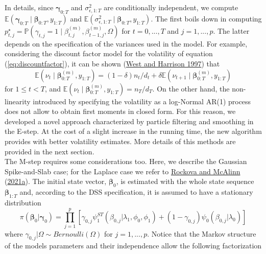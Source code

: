 \documentclass[
  12pt,
]{book}
\theoremstyle{break}
\theoremstyle{nonumberplain}
\begin{document}
In details, since \(\boldsymbol{\gamma}_{0:T}\) and
\(\sigma^2_{\epsilon,1:T}\) are conditionally independent, we compute
\(\mathbb E(\boldsymbol{\gamma}_{0:T}\mid\boldsymbol{\beta}_{0:T},y_{1:T})\)
and
\(\mathbb E(\sigma^2_{\epsilon,1:T}\mid\boldsymbol{\beta}_{0:T},y_{1:T})\).
The first boils down in computing
\(p^{\star}_{t,j} = \mathbb{P}(\gamma_{t,j}=1 \mid \beta_{t,j}^{(m)},\beta_{t-1,j}^{(m)},\Omega)\)
for \(t=0,...,T\) and \(j=1,...,p\). The latter depends on the
specification of the variances used in the model. For example,
considering the discount factor model for the volatility of equation
(\ref{eq:discountfactor}), it can be shown
(\protect\hyperlink{ref-WH_1997}{West and Harrison 1997}) that \[
\mathbb E(\nu_{t}\mid\boldsymbol{\beta}^{(m)}_{0:T},y_{1:T})=(1-\delta)n_{t}/d_{t}+\delta\mathbb E(\nu_{t+1}\mid\boldsymbol{\beta}^{(m)}_{0:T},y_{1:T})
\] for \(1\leq t <T\), and
\(\mathbb E(\nu_{t}\mid\boldsymbol{\beta}^{(m)}_{0:T},y_{1:T})=n_{T}/d_{T}\).
On the other hand, the non-linearity introduced by specifying the
volatility as a log-Normal AR(1) process does not allow to obtain first
moments in closed form. For this reason, we developed a novel approach
characterized by particle filtering and smoothing in the E-step. At the
cost of a slight increase in the running time, the new algorithm
provides with better volatility estimates. More details of this methods
are provided in the next section.\\
The M-step requires some considerations too. Here, we describe the
Gaussian Spike-and-Slab case; for the Laplace case we refer to
\protect\hyperlink{ref-rockova_mcalinn_2021}{Rockova and McAlinn}
(\protect\hyperlink{ref-rockova_mcalinn_2021}{2021a}). The initial state
vector, \(\boldsymbol{\beta}_{0}\), is estimated with the whole state
sequence \(\boldsymbol{\beta}_{1:T}\) and, according to the DSS
specification, it is assumed to have a stationary distribution
\begin{equation}
\pi(\boldsymbol{\beta}_{0}|\boldsymbol{\gamma}_{0})=\prod_{j=1}^{p}[\gamma_{0,j}\psi_{1}^{ST}(\beta_{0,j}|\lambda_{1},\phi_{0},\phi_{1})+(1-\gamma_{0,j})\psi_{0}(\beta_{0,j}|\lambda_{0})]
\end{equation} where \(\gamma_{0,j}| \Omega\sim Bernoulli(\Omega)\) for
\(j=1,...,p\). Notice that the Markov structure of the models parameters
and their independence allow the following factorization
\end{document}
